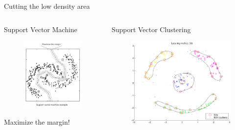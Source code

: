 \begin{frame}{Cutting the low density area}
\begin{columns}
\begin{column}{.5\textwidth}
Support Vector Machine
\begin{figure}
\hskip-30pt
\includegraphics[scale=0.35]{imgs/svm_sample.pdf}
\end{figure}
\color{blue}Maximize the margin!
\end{column}
\begin{column}{.5\textwidth}
Support Vector Clustering
\begin{figure}
\hskip-30pt
\includegraphics[scale=0.2]{imgs/svc1.pdf}\\ \hskip-30pt

\end{figure}
\end{column}
\end{columns}
\end{frame}
